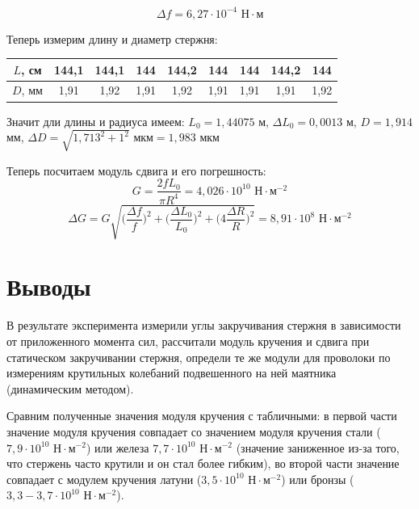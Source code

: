 \documentclass[a4paper, 12pt]{article} %
\begin{document}
\[\Delta f = 6,27 \cdot 10^{-4}\text{ Н} \cdot \text{м}\]

Теперь измерим длину и диаметр стержня:
\begin{center}
\begin{tabular}{|c|c|c|c|c|c|c|c|c|}
\hline 
$L$, см & 144,1 & 144,1 & 144 & 144,2 & 144 & 144 & 144,2 & 144 \\ 
\hline 
$D$, мм & 1,91 & 1,92 & 1,91 & 1,92 & 1,91 & 1,91 & 1,91 & 1,92  \\ 
\hline 
\end{tabular}
\end{center} 

Значит дли длины и радиуса имеем: $L_0 = 1,44075$ м, $\Delta L_0 = 0,0013$ м, $D = 1,914$ мм, $\Delta D = \sqrt{1,713^2 + 1^2} \text{ мкм} = 1,983 \text{ мкм}$ 

Теперь посчитаем модуль сдвига и его погрешность:
\[G = \frac{2fL_0}{\pi R^4} = 4,026 \cdot 10^{10}\text{ Н} \cdot \text{м}^{-2}\] 
\[\Delta G = G \sqrt{\Big( \frac{\Delta f}{f}\Big) ^2 + \Big(\frac{\Delta L_0}{L_0} \Big)^2 + \Big(4\frac{\Delta R}{R} \Big)^2}= 8,91 \cdot 10^8 \text{ Н} \cdot \text{м}^{-2}\]


\section{Выводы}

В результате эксперимента измерили углы закручивания стержня в зависимости от приложенного момента сил, рассчитали модуль кручения и сдвига при статическом закручивании стержня, определи те же модули для проволоки по измерениям крутильных колебаний подвешенного на ней маятника (динамическим методом). 

Сравним полученные значения модуля кручения с табличными: в первой части значение модуля кручения совпадает со значением модуля кручения стали ($7,9 \cdot 10^{10}\text{ Н} \cdot \text{м}^{-2}$) или железа $7,7 \cdot 10^{10}\text{ Н} \cdot \text{м}^{-2}$ (значение заниженное из-за того, что стержень часто крутили и он стал более гибким), во второй части значение совпадает с модулем кручения латуни ($3,5 \cdot 10^{10}\text{ Н} \cdot \text{м}^{-2}$) или бронзы ($3,3-3,7 \cdot 10^{10}\text{ Н} \cdot \text{м}^{-2}$).
\end{document}
